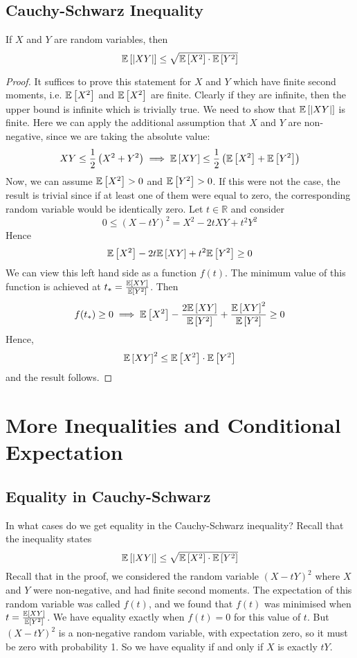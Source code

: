 \documentclass{article}
\begin{document}
\subsection{Cauchy-Schwarz Inequality}
\begin{theorem}
	If $X$ and $Y$ are random variables, then
	\[ \mathbb{E}\left[{\abs{XY}}\right] \leq \sqrt{\mathbb{E}\left[{X^2}\right]\cdot\mathbb{E}\left[{Y^2}\right]} \]
\end{theorem}
\begin{proof}
	It suffices to prove this statement for $X$ and $Y$ which have finite second moments, i.e. $\mathbb{E}\left[{X^2}\right]$ and $\mathbb{E}\left[{X^2}\right]$ are finite. Clearly if they are infinite, then the upper bound is infinite which is trivially true. We need to show that $\mathbb{E}\left[{\abs{XY}}\right]$ is finite. Here we can apply the additional assumption that $X$ and $Y$ are non-negative, since we are taking the absolute value:
	\[ XY \leq \frac{1}{2}\left(X^2 + Y^2\right) \implies \mathbb{E}\left[{XY}\right] \leq \frac{1}{2}\left( \mathbb{E}\left[{X^2}\right] + \mathbb{E}\left[{Y^2}\right]  \right) \]
	Now, we can assume $\mathbb{E}\left[{X^2}\right] > 0$ and $\mathbb{E}\left[{Y^2}\right] > 0$. If this were not the case, the result is trivial since if at least one of them were equal to zero, the corresponding random variable would be identically zero. Let $t \in \mathbb R$ and consider
	\[ 0 \leq (X - tY)^2 = X^2 - 2tXY + t^2Y^2 \]
	Hence
	\[ \mathbb{E}\left[{X^2}\right] - 2t\mathbb{E}\left[{XY}\right] + t^2\mathbb{E}\left[{Y^2}\right] \geq 0 \]
	We can view this left hand side as a function $f(t)$. The minimum value of this function is achieved at $t_\ast = \frac{\mathbb{E}\left[{XY}\right]}{\mathbb{E}\left[{Y^2}\right]}$. Then
	\[ f(t_\ast) \geq 0 \implies \mathbb{E}\left[{X^2}\right] - \frac{2\mathbb{E}\left[{XY}\right]}{\mathbb{E}\left[{Y^2}\right]} + \frac{\mathbb{E}\left[{XY}\right]^2}{\mathbb{E}\left[{Y^2}\right]} \geq 0 \]
	Hence,
	\[ \mathbb{E}\left[{XY}\right]^2 \leq \mathbb{E}\left[{X^2}\right]\cdot \mathbb{E}\left[{Y^2}\right] \]
	and the result follows.
\end{proof}

\section{More Inequalities and Conditional Expectation}
\subsection{Equality in Cauchy-Schwarz}
In what cases do we get equality in the Cauchy-Schwarz inequality? Recall that the inequality states
\[ \mathbb{E}\left[{\abs{XY}}\right] \leq \sqrt{\mathbb{E}\left[{X^2}\right]\cdot\mathbb{E}\left[{Y^2}\right]} \]
Recall that in the proof, we considered the random variable $(X - tY)^2$ where $X$ and $Y$ were non-negative, and had finite second moments. The expectation of this random variable was called $f(t)$, and we found that $f(t)$ was minimised when $t = \frac{\mathbb{E}\left[{XY}\right]}{\mathbb{E}\left[{Y^2}\right]}$. We have equality exactly when $f(t) = 0$ for this value of $t$. But $(X - tY)^2$ is a non-negative random variable, with expectation zero, so it must be zero with probability 1. So we have equality if and only if $X$ is exactly $tY$.
\end{document}
